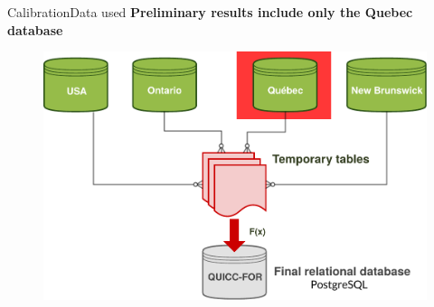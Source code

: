 \documentclass[10pt,aspectratio=149]{beamer}
\begin{document}

\begin{frame}[t]{Calibration}{Data used}
	\vspace{-1em}
	\center \textbf{Preliminary results include only the Quebec database}
\begin{figure}
	\includegraphics[width=.70\paperwidth]{Figs/quiccfor2.pdf}
\end{figure}

\end{frame}


\end{document}

